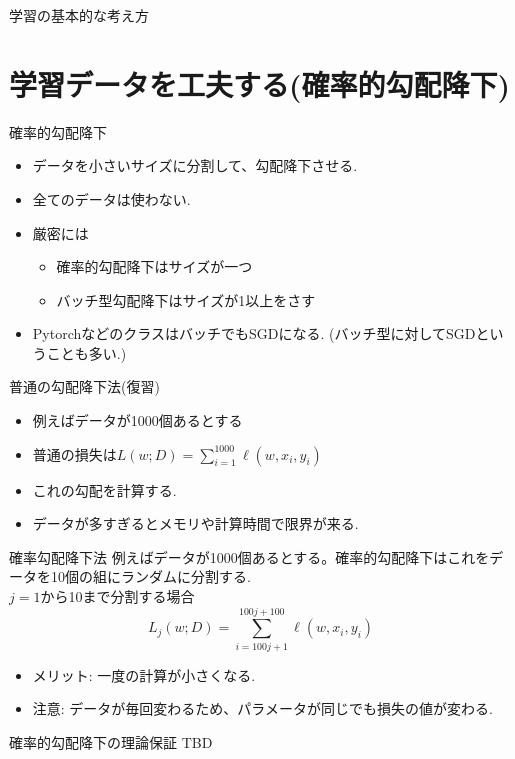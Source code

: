 \begin{frame}[fragile]{学習の基本的な考え方}
\section{学習データを工夫する(確率的勾配降下)}
\begin{frame}[fragile]{確率的勾配降下}
\begin{itemize}
\item データを小さいサイズに分割して、勾配降下させる.
\item 全てのデータは使わない.
\item 厳密には
  \begin{itemize}
  \item 確率的勾配降下はサイズが一つ
  \item バッチ型勾配降下はサイズが1以上をさす
  \end{itemize}
\item PytorchなどのクラスはバッチでもSGDになる.
  (バッチ型に対してSGDということも多い.)
\end{itemize}
\end{frame}


\begin{frame}[fragile]{普通の勾配降下法(復習)}
\begin{itemize}
\item 例えばデータが1000個あるとする
\item 普通の損失は$L(w;D)  = \sum_{i = 1}^{1000} \ell(w, x_i, y_i)$
\item これの勾配を計算する.
\item データが多すぎるとメモリや計算時間で限界が来る.
\end{itemize}
\end{frame}


\begin{frame}[fragile]{確率勾配降下法}
例えばデータが1000個あるとする。確率的勾配降下はこれをデータを10個の組にランダムに分割する. \\
$j=1$から10まで分割する場合
\begin{equation*}
  L_j(w;D)  = \sum_{i = 100j +1}^{100j + 100} \ell(w, x_i, y_i)
\end{equation*}
\begin{itemize}
\item  メリット: 一度の計算が小さくなる.
\item 注意: データが毎回変わるため、パラメータが同じでも損失の値が変わる.
\end{itemize}
\end{frame}


\begin{frame}[fragile]{確率的勾配降下の理論保証}
  TBD
\end{frame}


\end{frame}
